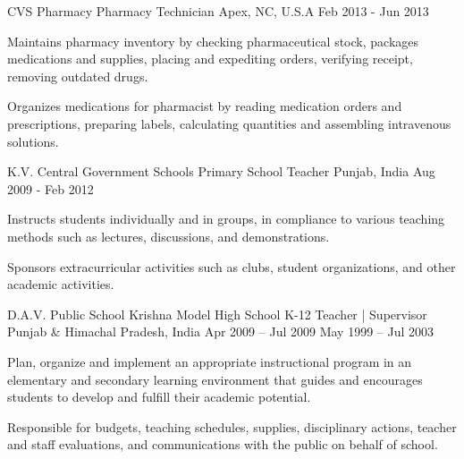 \begin{cventries}
  \cventry
    {CVS Pharmacy} %
    {Pharmacy Technician} %
    {Apex, NC, U.S.A} %
    {Feb 2013 - Jun 2013} %
    {
      \begin{cvitems} %
        \item {Maintains pharmacy inventory by checking pharmaceutical stock, packages medications and supplies, placing and expediting orders, verifying receipt, removing outdated drugs.}
        \item {Organizes medications for pharmacist by reading medication orders and prescriptions, preparing labels, calculating quantities and assembling intravenous solutions.}
      \end{cvitems}
    }

    \cventry
    {K.V. Central Government Schools} %
    {Primary School Teacher} %
    {Punjab, India} %
    {Aug 2009 - Feb 2012} %
    {
      \begin{cvitems} %
        \item {Instructs students individually and in groups, in compliance to various teaching methods such as lectures, discussions, and demonstrations.}
        \item {Sponsors extracurricular activities such as clubs, student organizations, and other academic activities.}
      \end{cvitems}
    }

\cventry
    {
    {D.A.V. Public School}
    {\newline}
    \vspace{-.4\baselineskip}
    {Krishna Model High School}
    } %
    {K-12 Teacher | Supervisor} %
    {Punjab \& Himachal Pradesh, India} %
    {
    {Apr 2009 – Jul 2009}
    {\newline}
    \vspace{-.4\baselineskip}
    {May 1999 – Jul 2003}
    }%
    {
      \begin{cvitems} %
        \item {Plan, organize and implement an appropriate instructional program in an elementary and secondary learning environment that guides and encourages students to develop and fulfill their academic potential.}
        \item {Responsible for budgets, teaching schedules, supplies, disciplinary actions, teacher and staff evaluations, and communications with the public on behalf of school.}
      \end{cvitems}
    }


\end{cventries}
